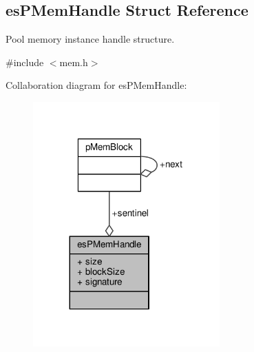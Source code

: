 \hypertarget{structesPMemHandle}{\subsection{es\-P\-Mem\-Handle Struct Reference}
\label{structesPMemHandle}
}


Pool memory instance handle structure.  




{\ttfamily \#include $<$mem.\-h$>$}



Collaboration diagram for es\-P\-Mem\-Handle\-:\nopagebreak
\begin{figure}[H]
\begin{center}
\leavevmode
\includegraphics[width=203pt]{structesPMemHandle__coll__graph}
\end{center}
\end{figure}
